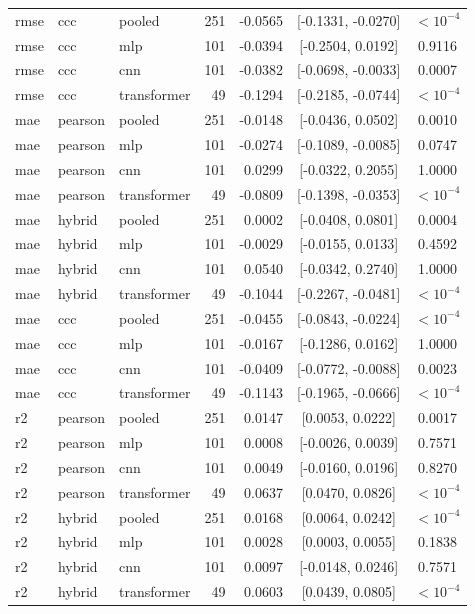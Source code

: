 \begin{longtable}{lllrrcc}
rmse & ccc & pooled & 251 & -0.0565 & [-0.1331, -0.0270] & $<10^{-4}$ \\
rmse & ccc & mlp & 101 & -0.0394 & [-0.2504, 0.0192] & 0.9116 \\
rmse & ccc & cnn & 101 & -0.0382 & [-0.0698, -0.0033] & 0.0007 \\
rmse & ccc & transformer & 49 & -0.1294 & [-0.2185, -0.0744] & $<10^{-4}$ \\
mae & pearson & pooled & 251 & -0.0148 & [-0.0436, 0.0502] & 0.0010 \\
mae & pearson & mlp & 101 & -0.0274 & [-0.1089, -0.0085] & 0.0747 \\
mae & pearson & cnn & 101 & 0.0299 & [-0.0322, 0.2055] & 1.0000 \\
mae & pearson & transformer & 49 & -0.0809 & [-0.1398, -0.0353] & $<10^{-4}$ \\
mae & hybrid & pooled & 251 & 0.0002 & [-0.0408, 0.0801] & 0.0004 \\
mae & hybrid & mlp & 101 & -0.0029 & [-0.0155, 0.0133] & 0.4592 \\
mae & hybrid & cnn & 101 & 0.0540 & [-0.0342, 0.2740] & 1.0000 \\
mae & hybrid & transformer & 49 & -0.1044 & [-0.2267, -0.0481] & $<10^{-4}$ \\
mae & ccc & pooled & 251 & -0.0455 & [-0.0843, -0.0224] & $<10^{-4}$ \\
mae & ccc & mlp & 101 & -0.0167 & [-0.1286, 0.0162] & 1.0000 \\
mae & ccc & cnn & 101 & -0.0409 & [-0.0772, -0.0088] & 0.0023 \\
mae & ccc & transformer & 49 & -0.1143 & [-0.1965, -0.0666] & $<10^{-4}$ \\
r2 & pearson & pooled & 251 & 0.0147 & [0.0053, 0.0222] & 0.0017 \\
r2 & pearson & mlp & 101 & 0.0008 & [-0.0026, 0.0039] & 0.7571 \\
r2 & pearson & cnn & 101 & 0.0049 & [-0.0160, 0.0196] & 0.8270 \\
r2 & pearson & transformer & 49 & 0.0637 & [0.0470, 0.0826] & $<10^{-4}$ \\
r2 & hybrid & pooled & 251 & 0.0168 & [0.0064, 0.0242] & $<10^{-4}$ \\
r2 & hybrid & mlp & 101 & 0.0028 & [0.0003, 0.0055] & 0.1838 \\
r2 & hybrid & cnn & 101 & 0.0097 & [-0.0148, 0.0246] & 0.7571 \\
r2 & hybrid & transformer & 49 & 0.0603 & [0.0439, 0.0805] & $<10^{-4}$ \\

\end{longtable}
